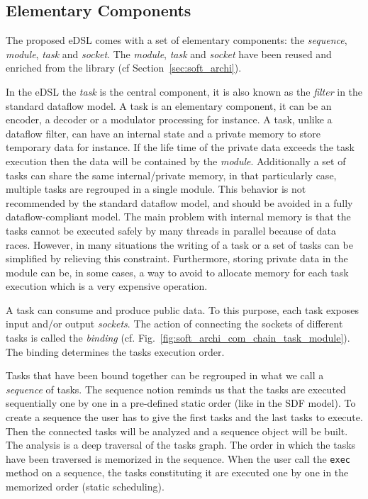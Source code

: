 \subsection{Elementary Components}

The proposed eDSL comes with a set of elementary components: the
\emph{sequence}, \emph{module}, \emph{task} and \emph{socket}. The
\emph{module}, \emph{task} and \emph{socket} have been reused and enriched
from the \AFFECT library (cf Section~\ref{sec:soft_archi}).

In the eDSL the \emph{task} is the central component, it is also known as the
\emph{filter} in the standard dataflow model. A task is an elementary component,
it can be an encoder, a decoder or a modulator processing for instance. A task,
unlike a dataflow filter, can have an internal state and a private memory to
store temporary data for instance. If the life time of the private data exceeds
the task execution then the data will be contained by the \emph{module}.
Additionally a set of tasks can share the same internal/private memory, in that
particularly case, multiple tasks are regrouped in a single module. This
behavior is not recommended by the standard dataflow model, and should be
avoided in a fully dataflow-compliant model. The main problem with internal
memory is that the tasks cannot be executed safely by many threads in parallel
because of data races. However, in many situations the writing of a task or a
set of tasks can be simplified by relieving this constraint. Furthermore,
storing private data in the module can be, in some cases, a way to avoid to
allocate memory for each task execution which is a very expensive operation.

A task can consume and produce public data. To this purpose, each task exposes
input and/or output \emph{sockets}. The action of connecting the sockets of
different tasks is called the \emph{binding} (cf.
Fig.~\ref{fig:soft_archi_com_chain_task_module}).
The binding determines the tasks execution order.

Tasks that have been bound together can be regrouped in what we call a
\emph{sequence} of tasks. The sequence notion reminds us that the tasks are
executed sequentially one by one in a pre-defined static order (like in the SDF
model). To create a sequence the user has to give the first tasks and the
last tasks to execute. Then the connected tasks will be analyzed and a sequence
object will be built. The analysis is a deep traversal of the tasks graph. The
order in which the tasks have been traversed is memorized in the sequence.
When the user call the \verb|exec| method on a sequence, the tasks constituting
it are executed one by one in the memorized order (static scheduling).

